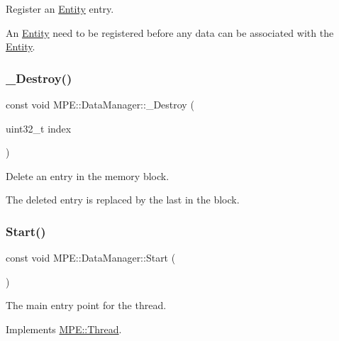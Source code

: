 Register an \hyperlink{struct_m_p_e_1_1_entity}{Entity} entry. 

An \hyperlink{struct_m_p_e_1_1_entity}{Entity} need to be registered before any data can be associated with the \hyperlink{struct_m_p_e_1_1_entity}{Entity}. \mbox{\label{class_m_p_e_1_1_data_manager_aac128f82ae3d0e37ce8afc46f493dc4b}} 
\subsubsection{\texorpdfstring{\+\_\+\+Destroy()}{\_Destroy()}}
{\footnotesize\ttfamily const void M\+P\+E\+::\+Data\+Manager\+::\+\_\+\+Destroy (\begin{DoxyParamCaption}\item[{uint32\+\_\+t}]{index }\end{DoxyParamCaption})\hspace{0.3cm}{\ttfamily [private]}}



Delete an entry in the memory block. 

The deleted entry is replaced by the last in the block. \mbox{\label{class_m_p_e_1_1_data_manager_aa8d6f1ef687afb532d968a3c1a42f324}} 
\subsubsection{\texorpdfstring{Start()}{Start()}}
{\footnotesize\ttfamily const void M\+P\+E\+::\+Data\+Manager\+::\+Start (\begin{DoxyParamCaption}{ }\end{DoxyParamCaption})\hspace{0.3cm}{\ttfamily [virtual]}}



The main entry point for the thread. 



Implements \hyperlink{class_m_p_e_1_1_thread_a1bd133a96ec27c868b6bb758e11c0691}{M\+P\+E\+::\+Thread}.



